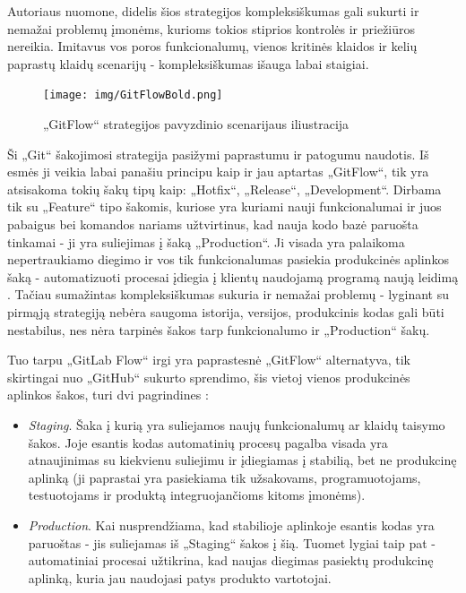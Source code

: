 \documentclass{VUMIFPSkursinis}
\begin{document}
Autoriaus nuomone, didelis šios strategijos kompleksiškumas gali sukurti ir nemažai problemų įmonėms, kurioms tokios stiprios kontrolės ir priežiūros nereikia. Imitavus vos poros funkcionalumų, vienos kritinės klaidos ir kelių paprastų klaidų scenarijų - kompleksiškumas išauga labai staigiai.

\begin{figure}[H]
    \centering
    \texttt{[image: img/GitFlowBold.png]}
    \caption{„GitFlow“ strategijos pavyzdinio scenarijaus iliustracija}
    \label{img:mlp}
\end{figure}


Ši „Git“ šakojimosi strategija pasižymi paprastumu ir patogumu naudotis. Iš esmės ji veikia labai panašiu principu kaip ir jau aptartas „GitFlow“, tik yra atsisakoma tokių šakų tipų kaip: „Hotfix“, „Release“, „Development“. Dirbama tik su „Feature“ tipo šakomis, kuriose yra kuriami nauji funkcionalumai ir juos pabaigus bei komandos nariams užtvirtinus, kad nauja kodo bazė paruošta tinkamai - ji yra suliejimas į šaką „Production“. Ji visada yra palaikoma nepertraukiamo diegimo ir vos tik funkcionalumas pasiekia produkcinės aplinkos šaką - automatizuoti procesai įdiegia į klientų naudojamą programą naują leidimą \cite{SaltDevintas}. Tačiau sumažintas kompleksiškumas sukuria ir nemažai problemų - lyginant su pirmąją strategiją nebėra saugoma istorija, versijos, produkcinis kodas gali būti nestabilus, nes nėra tarpinės šakos tarp funkcionalumo ir „Production“ šakų.

Tuo tarpu „GitLab Flow“ irgi yra paprastesnė „GitFlow“ alternatyva, tik skirtingai nuo „GitHub“ sukurto sprendimo, šis vietoj vienos produkcinės aplinkos šakos, turi dvi pagrindines \cite{SaltDesimtas}:

\begin{itemize}
  \item \textit{Staging}. Šaka į kurią yra suliejamos naujų funkcionalumų ar klaidų taisymo šakos. Joje esantis kodas automatinių procesų pagalba visada yra atnaujinimas su kiekvienu suliejimu ir įdiegiamas į stabilią, bet ne produkcinę aplinką (ji paprastai yra pasiekiama tik užsakovams, programuotojams, testuotojams ir produktą integruojančioms kitoms įmonėms).
  
  \item \textit{Production}. Kai nusprendžiama, kad stabilioje aplinkoje esantis kodas yra paruoštas - jis suliejamas iš „Staging“ šakos į šią. Tuomet lygiai taip pat - automatiniai procesai užtikrina, kad naujas diegimas pasiektų produkcinę aplinką, kuria jau naudojasi patys produkto vartotojai.

\end{itemize}
\end{document}
